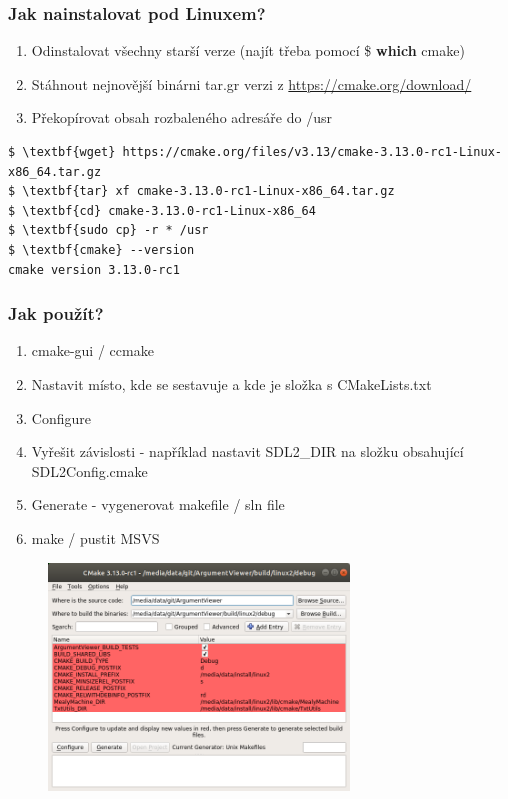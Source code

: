 \begin{frame}[fragile]
\frametitle{Jak nainstalovat pod Linuxem?}
	\begin{enumerate}
    \item Odinstalovat všechny starší verze (najít třeba pomocí \$ \textbf{which} cmake)
    \item Stáhnout nejnovější binárni tar.gr verzi z \url{https://cmake.org/download/}
    \item Překopírovat obsah rozbaleného adresáře do /usr
	\end{enumerate}
{\scriptsize
\begin{Verbatim}[commandchars=\\\{\}]
$ \textbf{wget} https://cmake.org/files/v3.13/cmake-3.13.0-rc1-Linux-x86_64.tar.gz
$ \textbf{tar} xf cmake-3.13.0-rc1-Linux-x86_64.tar.gz
$ \textbf{cd} cmake-3.13.0-rc1-Linux-x86_64
$ \textbf{sudo cp} -r * /usr
$ \textbf{cmake} --version
cmake version 3.13.0-rc1
\end{Verbatim}
}
\end{frame}

\begin{frame}
\frametitle{Jak použít?}
{\scriptsize
	\begin{enumerate}
	\item cmake-gui / ccmake
	\item Nastavit místo, kde se sestavuje a kde je složka s CMakeLists.txt
	\item Configure
	\item Vyřešit závislosti - například nastavit SDL2\_DIR na složku obsahující SDL2Config.cmake
  \item Generate - vygenerovat makefile / sln file
  \item make / pustit MSVS
	\end{enumerate}
}
	\begin{figure}[h]
	\includegraphics[width=8cm,keepaspectratio]{pics/introduction/cmake-gui}
	\end{figure}
\end{frame}


